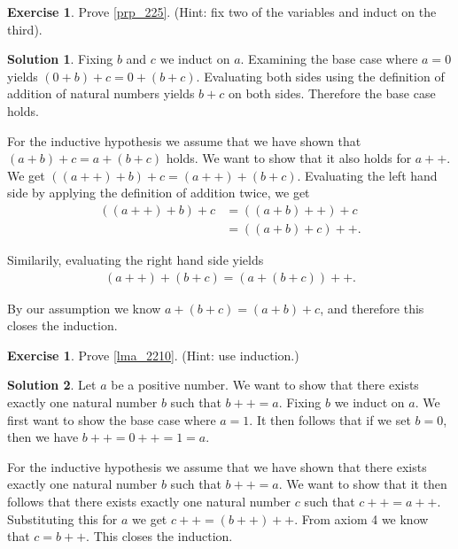 \documentclass[a4paper, twocolumn]{report}
\newcounter{exercise} \numberwithin{exercise}{section}
\theoremstyle{definition}
\newtheorem{exc}[exercise]{Exercise}
\theoremstyle{solution}
\newtheorem*{sltn}{Solution}
\newcommand{\dplus}{{+}{+}} %
\begin{document}
\begin{exc}
  Prove \ref{prp_225}. (Hint: fix two of the variables and induct on the third).
\end{exc}

\begin{sltn}
  Fixing $b$ and $c$ we induct on $a$.  Examining the base case where $a = 0$
  yields $(0 + b) + c = 0 + (b + c)$. Evaluating both sides using the definition
  of addition of natural numbers yields $b + c$ on both sides. Therefore the base
  case holds.

  For the inductive hypothesis we assume that we have shown that $( a + b ) + c =
  a + (b + c)$ holds. We want to show that it also holds for $a\dplus$.  We get
  $\left( \left( a\dplus \right) + b \right) + c = \left( a\dplus \right) + (b +
  c)$.  Evaluating the left hand side by applying the definition of addition
  twice, we get
  \begin{align*}
    \left( \left( a\dplus \right) + b \right) + c &= \left( \left(a + b\right)\dplus\right) + c \\
    &= \left( \left( a + b \right) + c \right)\dplus.
  \end{align*}

  Similarily, evaluating the right hand side yields
  \begin{align*}
    \left( a\dplus \right) + (b + c) = (a + (b + c))\dplus.
  \end{align*}

  By our assumption we know $a + (b + c) = (a + b) + c$, and therefore this
  closes the induction.
\end{sltn}

\begin{exc}
  Prove \ref{lma_2210}. (Hint: use induction.)
\end{exc}
\begin{sltn}
  Let $a$ be a positive number. We want to show that there exists exactly one
  natural number $b$ such that $b\dplus = a$.  Fixing $b$ we induct on $a$. We
  first want to show the base case where $a = 1$.  It then follows that if we
  set $b = 0$, then we have $b\dplus = 0\dplus = 1 = a$.  

  For the inductive hypothesis we assume that we have shown that there exists
  exactly one natural number $b$ such that $b\dplus = a$. We want to show that
  it then follows that there exists exactly one natural number $c$ such that
  $c\dplus = a\dplus$.  Substituting this for $a$ we get $c \dplus =
  (b\dplus)\dplus$. From axiom 4 we know that $c = b\dplus$. This closes the
  induction.

\end{sltn}
\end{document}

